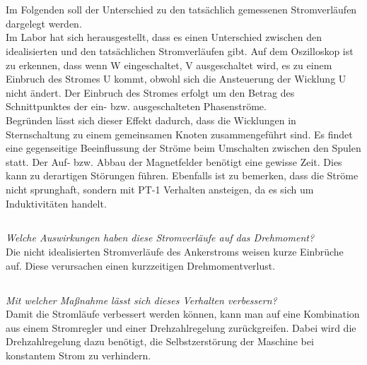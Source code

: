 \chapter{}\label{ch:auf6}
\section{}\label{sec:6a}
Im Folgenden soll der Unterschied zu den tatsächlich gemessenen Stromverläufen dargelegt werden.\\ 
Im Labor hat sich herausgestellt, dass es einen Unterschied zwischen den idealisierten und den tatsächlichen Stromverläufen gibt. Auf dem Oszilloskop ist zu erkennen, dass wenn W eingeschaltet, V ausgeschaltet wird, es zu einem Einbruch des Stromes U kommt, obwohl sich die Ansteuerung der Wicklung U nicht ändert. Der Einbruch des Stromes erfolgt um den Betrag des Schnittpunktes der ein- bzw. ausgeschalteten Phasenströme. \\
Begründen lässt sich dieser Effekt dadurch, dass die Wicklungen in Sternschaltung zu einem gemeinsamen Knoten zusammengeführt sind. Es findet eine gegenseitige Beeinflussung der Ströme beim Umschalten zwischen den Spulen statt. Der Auf- bzw. Abbau der Magnetfelder benötigt eine gewisse Zeit. Dies kann zu derartigen Störungen führen. Ebenfalls ist zu bemerken, dass die Ströme nicht sprunghaft, sondern mit PT-1 Verhalten ansteigen, da es sich um Induktivitäten handelt.

\section{}\label{sec:6b}
\textit{Welche Auswirkungen haben diese Stromverläufe auf das Drehmoment?}\\
Die nicht idealisierten Stromverläufe des Ankerstroms weisen kurze Einbrüche auf. Diese verursachen einen kurzzeitigen Drehmomentverlust.

\section{}\label{sec:6c}
\textit{Mit welcher Maßnahme lässt sich dieses Verhalten verbessern?}\\
Damit die Stromläufe verbessert werden können, kann man auf eine Kombination aus einem Stromregler und einer Drehzahlregelung zurückgreifen. Dabei wird die Drehzahlregelung dazu benötigt, die Selbstzerstörung der Maschine bei konstantem Strom zu verhindern.
